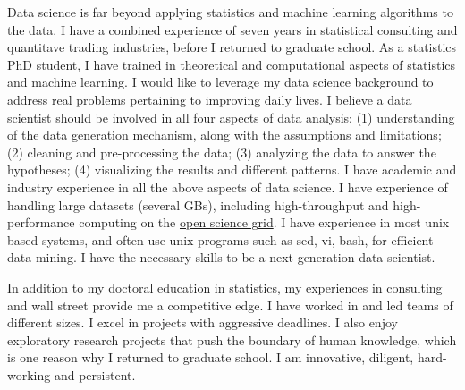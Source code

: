 \documentclass{letter} %
\begin{document}
\begin{letter}
\noindent %
Data science is far beyond applying statistics and machine learning algorithms to the data. I have a combined experience of seven years in statistical consulting and quantitave trading industries, before I returned to graduate school. As a statistics PhD student, I have trained in theoretical and computational aspects of statistics and machine learning. I would like to leverage my data science background to address real problems pertaining to improving daily lives. I believe a data scientist should be involved in all four aspects of data analysis: (1) understanding of the data generation mechanism, along with the assumptions and limitations; (2) cleaning and pre-processing the data; (3) analyzing the data to answer the hypotheses; (4) visualizing the results and different patterns. I have academic and industry experience in all the above aspects of data science. I have experience of handling large datasets (several GBs), including high-throughput and high-performance computing on the \href{http://www.opensciencegrid.org/}{open science grid}. I have experience in most unix based systems, and often use unix programs such as sed, vi, bash, for efficient data mining. I have the necessary skills to be a next generation data scientist. 

In addition to my doctoral education in statistics, my experiences in consulting and wall street provide me a competitive edge. I have worked in and led teams of different sizes. I excel in projects with aggressive deadlines. I also enjoy exploratory research projects that push the boundary of human knowledge, which is one reason why I returned to graduate school. I am innovative, diligent, hard-working and persistent. 


\end{letter}
\end{document}

